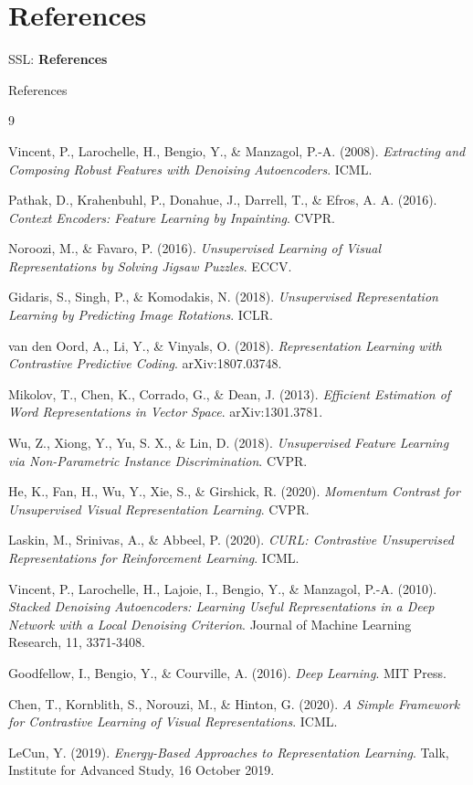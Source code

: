 \section{References}
\begin{frame}{}
    \LARGE SSL: \textbf{References}
\end{frame}

\begin{frame}[allowframebreaks]{References}
\begin{thebibliography}{9}

Vincent, P., Larochelle, H., Bengio, Y., \& Manzagol, P.-A. (2008). \textit{Extracting and Composing Robust Features with Denoising Autoencoders}. ICML.

Pathak, D., Krahenbuhl, P., Donahue, J., Darrell, T., \& Efros, A. A. (2016). \textit{Context Encoders: Feature Learning by Inpainting}. CVPR.

Noroozi, M., \& Favaro, P. (2016). \textit{Unsupervised Learning of Visual Representations by Solving Jigsaw Puzzles}. ECCV.

Gidaris, S., Singh, P., \& Komodakis, N. (2018). \textit{Unsupervised Representation Learning by Predicting Image Rotations}. ICLR.

van den Oord, A., Li, Y., \& Vinyals, O. (2018). \textit{Representation Learning with Contrastive Predictive Coding}. arXiv:1807.03748.

Mikolov, T., Chen, K., Corrado, G., \& Dean, J. (2013). \textit{Efficient Estimation of Word Representations in Vector Space}. arXiv:1301.3781.

Wu, Z., Xiong, Y., Yu, S. X., \& Lin, D. (2018). \textit{Unsupervised Feature Learning via Non-Parametric Instance Discrimination}. CVPR.

He, K., Fan, H., Wu, Y., Xie, S., \& Girshick, R. (2020). \textit{Momentum Contrast for Unsupervised Visual Representation Learning}. CVPR.

Laskin, M., Srinivas, A., \& Abbeel, P. (2020). \textit{CURL: Contrastive Unsupervised Representations for Reinforcement Learning}. ICML.

Vincent, P., Larochelle, H., Lajoie, I., Bengio, Y., \& Manzagol, P.-A. (2010). \textit{Stacked Denoising Autoencoders: Learning Useful Representations in a Deep Network with a Local Denoising Criterion}. Journal of Machine Learning Research, 11, 3371-3408.

Goodfellow, I., Bengio, Y., \& Courville, A. (2016). \textit{Deep Learning}. MIT Press.

Chen, T., Kornblith, S., Norouzi, M., \& Hinton, G. (2020). \textit{A Simple Framework for Contrastive Learning of Visual Representations}. ICML.

LeCun, Y. (2019). \textit{Energy-Based Approaches to Representation Learning}. Talk, Institute for Advanced Study, 16 October 2019.

\end{thebibliography}
\end{frame}